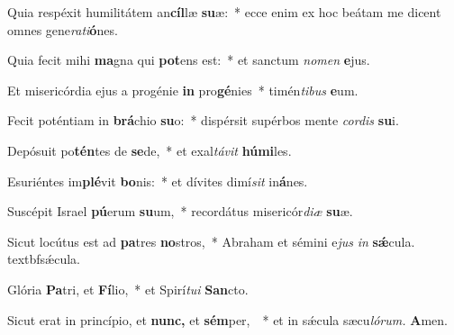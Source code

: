 \item Quia respéxit humilitátem an\textbf{cíl}læ \textbf{su}æ:~* ecce enim ex hoc beátam me dicent omnes gene\textit{rati}\textbf{ó}nes.
\item Quia fecit mihi \textbf{ma}gna qui \textbf{pot}ens est:~* et sanctum \textit{nomen} \textbf{e}jus.
\item Et misericórdia ejus a progénie \textbf{in} pro\textbf{gé}nies~* timén\textit{tibus} \textbf{e}um.
\item Fecit poténtiam in \textbf{brá}chio \textbf{su}o:~* dispérsit supérbos mente \textit{cordis} \textbf{su}i.
\item Depósuit po\textbf{tén}tes de \textbf{se}de,~* et exal\textit{távit} \textbf{húmi}les.
\item Esuriéntes im\textbf{plé}vit \textbf{bo}nis:~* et dívites dimí\hspace*{0.02em}\textit{sit} in\textbf{á}nes.
\item Suscépit Israel \textbf{pú}erum \textbf{su}um,~* recordátus misericór\textit{diæ} \textbf{su}æ.
\item Sicut locútus est ad \textbf{pa}tres \textbf{no}stros,~* Abraham et sémini e\hspace*{0.02em}\textit{jus} \textit{in} \textbf{sǽ}cula. textbf{sǽcu}la.
\item Glória \textbf{Pa}tri, et \textbf{Fí}lio,~* et Spirí\tinyhspace\textit{tui} \textbf{San}cto.
\item Sicut erat in princípio, et \textbf{nunc,} et \textbf{sém}per, ~* et in sǽcula sæcu\tinyhspace\textit{lórum.} \textbf{A}men.